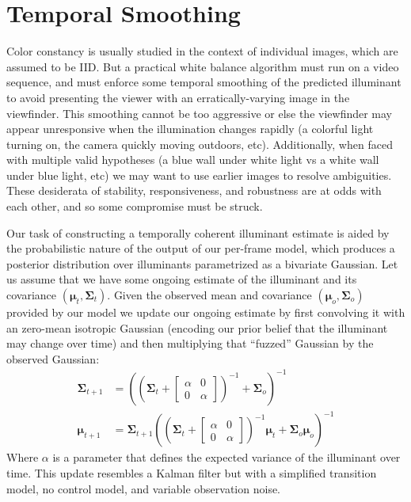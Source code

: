 \documentclass[10pt,twocolumn,letterpaper]{article}
\begin{document}
\section{Temporal Smoothing}
\label{sec:temporal}

Color constancy is usually studied in the context of
individual images, which are assumed to be IID.
But a practical white balance algorithm must run on a video sequence,
and must enforce some temporal smoothing of the predicted illuminant
to avoid presenting the viewer with an erratically-varying image in the viewfinder.
This smoothing cannot be too aggressive or else the viewfinder may appear
unresponsive when the illumination changes rapidly
(a colorful light turning on, the camera quickly moving outdoors, etc).
Additionally, when faced with multiple valid hypotheses
(a blue wall under white light vs a white wall under blue light, etc) we
may want to use earlier images to resolve ambiguities.
These desiderata of stability, responsiveness, and robustness are at odds
with each other, and so some compromise must be struck.

Our task of constructing a temporally coherent illuminant estimate is aided
by the probabilistic nature of the output of our per-frame model, which
produces a posterior distribution over illuminants parametrized as a bivariate
Gaussian.
Let us assume that we have some ongoing estimate of the illuminant and its
covariance $(\boldsymbol{\mu}_t, \boldsymbol{\Sigma}_t)$.
Given the observed mean and covariance $(\boldsymbol{\mu}_o, \boldsymbol{\Sigma}_o)$
provided by our model we update our
ongoing estimate by first convolving it with an zero-mean isotropic Gaussian
(encoding our prior belief that the illuminant may change over time)
and then multiplying that ``fuzzed'' Gaussian by the observed Gaussian:
\begin{align}
\boldsymbol{\Sigma}_{t+1} &= \left( \left( \boldsymbol{\Sigma}_t + \begin{bmatrix}\alpha&0\\0&\alpha\end{bmatrix} \right)^{-1} + \boldsymbol{\Sigma}_o \right)^{-1} \\
\boldsymbol{\mu}_{t+1} &= \boldsymbol{\Sigma}_{t+1} \left( \left( \boldsymbol{\Sigma}_t + \begin{bmatrix}\alpha&0\\0&\alpha\end{bmatrix} \right)^{-1} \boldsymbol{\mu}_t + \boldsymbol{\Sigma}_o \boldsymbol{\mu}_o \right)^{-1} \nonumber
\end{align}
Where $\alpha$ is a parameter that defines the expected variance of the
illuminant over time.
This update resembles a Kalman filter but with a simplified transition model,
no control model, and variable observation noise.
\end{document}
